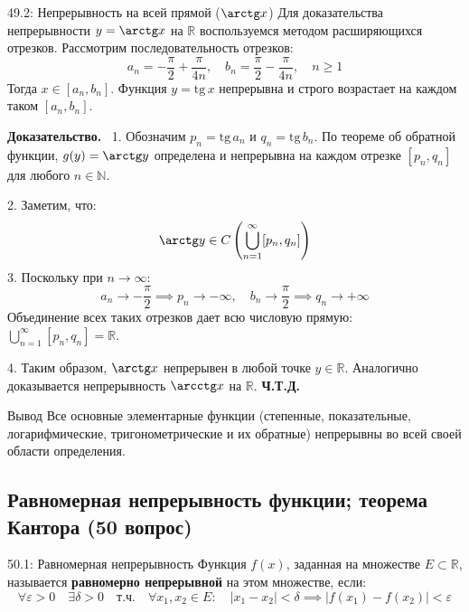 \documentclass[a4paper,12pt]{article}
\newcommand{\myproof}{\textbf{Доказательство.}\ }
\begin{document}
	\begin{theorembox}{49.2: Непрерывность на всей прямой ($\arctg x$)}
		Для доказательства непрерывности $y = \arctg x$ на $\mathbb{R}$ воспользуемся методом расширяющихся отрезков. Рассмотрим последовательность отрезков:
		$$ a_n = -\frac{\pi}{2} + \frac{\pi}{4n}, \quad b_n = \frac{\pi}{2} - \frac{\pi}{4n}, \quad n \geq 1 $$
		Тогда $x \in [a_n, b_n]$. Функция $y = \text{tg}\,x$ непрерывна и строго возрастает на каждом таком $[a_n, b_n]$.
	\end{theorembox}
	
	\vspace{0.5cm}
	\myproof
	1. Обозначим $p_n = \text{tg}\,a_n$ и $q_n = \text{tg}\,b_n$. По теореме об обратной функции, $g(y) = \arctg y$ определена и непрерывна на каждом отрезке $[p_n, q_n]$ для любого $n \in \mathbb{N}$.
	
	2. Заметим, что:
	$$ \arctg y \in C\left( \bigcup_{n=1}^{\infty} [p_n, q_n] \right) $$
	3. Поскольку при $n \to \infty$:
	$$ a_n \to -\frac{\pi}{2} \implies p_n \to -\infty, \quad b_n \to \frac{\pi}{2} \implies q_n \to +\infty $$
	Объединение всех таких отрезков дает всю числовую прямую: $\bigcup_{n=1}^{\infty} [p_n, q_n] = \mathbb{R}$.
	
	4. Таким образом, $\arctg x$ непрерывен в любой точке $y \in \mathbb{R}$. Аналогично доказывается непрерывность $\arcctg x$ на $\mathbb{R}$.
	\textbf{Ч.Т.Д.}
	
	\vspace{0.5cm}
	\begin{importantbox}{Вывод}
		Все основные элементарные функции (степенные, показательные, логарифмические, тригонометрические и их обратные) непрерывны во всей своей области определения.
	\end{importantbox}
	
	
	
	\newpage
	\subsection{Равномерная непрерывность функции; теорема Кантора (50 вопрос)}
	
	\begin{definitionbox}{50.1: Равномерная непрерывность}
		Функция $f(x)$, заданная на множестве $E \subset \mathbb{R}$, называется \textbf{равномерно непрерывной} на этом множестве, если:
		$$ \forall \varepsilon > 0 \quad \exists \delta > 0 \quad \text{т.ч.} \quad \forall x_1, x_2 \in E: \quad |x_1 - x_2| < \delta \implies |f(x_1) - f(x_2)| < \varepsilon $$
	\end{definitionbox}
	
\end{document}
